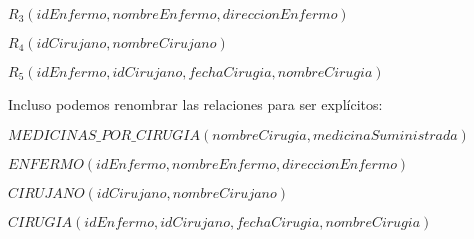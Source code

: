 \begin{itemize}
\begin{center}
    $R_3(idEnfermo, nombreEnfermo, direccionEnfermo)$
    
    $R_4(idCirujano, nombreCirujano)$
    
    $R_5(idEnfermo, idCirujano, fechaCirugia, nombreCirugia)$

\end{center}

Incluso podemos renombrar las relaciones para ser explícitos:
\begin{center}
    $MEDICINAS\_POR\_CIRUGIA(nombreCirugia, medicinaSuministrada)$
    
    $ENFERMO(idEnfermo, nombreEnfermo, direccionEnfermo)$
    
    $CIRUJANO(idCirujano, nombreCirujano)$
    
    $CIRUGIA(idEnfermo, idCirujano, fechaCirugia, nombreCirugia)$

\end{center}
\end{itemize}

